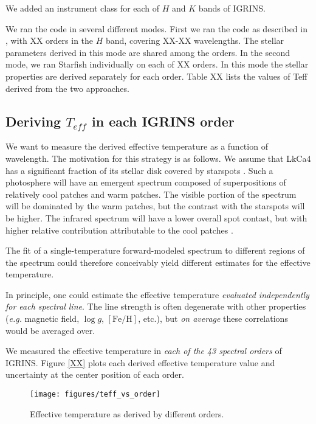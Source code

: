 \documentclass[iop,revtex4]{emulateapj}%
\begin{document}
We added an instrument class for each of $H$ and $K$ bands of IGRINS.

We ran the code in several different modes.  First we ran the code as described in \citet{}, with XX orders in the $H$ band, covering XX-XX wavelengths.  The stellar parameters derived in this mode are shared among the orders.  In the second mode, we ran Starfish individually on each of XX orders.  In this mode the stellar properties are derived separately for each order.  Table XX lists the values of Teff derived from the two approaches.

\subsection{Deriving $T_{eff}$ in each IGRINS order}

We want to measure the derived effective temperature as a function of wavelength.  The motivation for this strategy is as follows.  We assume that LkCa4 has a significant fraction of its stellar disk covered by starspots \cite{XX}.  Such a photosphere will have an emergent spectrum composed of superpositions of relatively cool patches and warm patches.  The visible portion of the spectrum will be dominated by the warm patches, but the contrast with the starspots will be higher.  The infrared spectrum will have a lower overall spot contast, but with higher relative contribution attributable to the cool patches \citep[e.g. Prato]{XX}.  

The fit of a single-temperature forward-modeled spectrum to different regions of the spectrum could therefore conceivably yield different estimates for the effective temperature.

In principle, one could estimate the effective temperature \emph{evaluated independently for each spectral line}.  The line strength is often degenerate with other properties (\emph{e.g.} magnetic field, $\log{g}$, $[\mathrm{Fe}/\mathrm{H}]$, etc.), but \emph{on average} these correlations would be averaged over.

We measured the effective temperature in \emph{each of the 43 spectral orders} of IGRINS.  Figure \ref{XX} plots each derived effective temperature value and uncertainty at the center position of each order.

\begin{figure*}
	\centering
	\texttt{[image: figures/teff\_vs\_order]} 
	\caption{Effective temperature as derived by different orders.}
	\label{fig:teffOrder}
\end{figure*}
\end{document}
